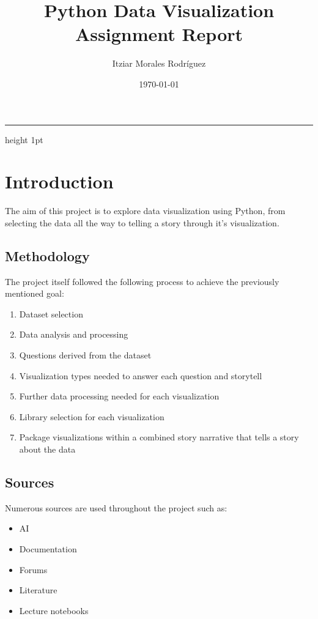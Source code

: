 \documentclass[a4paper,11pt]{article}
\title{\color{accent}\Huge Python Data Visualization\\Assignment Report}
\author{\Large\color{black}Itziar Morales Rodríguez}
\date{\large\color{black}\today}
\begin{document}
\pagecolor{background}\color{black}

\maketitle
\vspace{1em}
\hrule height 1pt \color{black}

\tableofcontents
\newpage

\section{Introduction}

\par
The aim of this project is to explore data visualization using Python, from
selecting the data all the way to telling a story through it's visualization.

\subsection{Methodology}

\par
The project itself followed the following process to achieve the previously
mentioned goal:
\begin{enumerate}
	\item Dataset selection
	\item Data analysis and processing
	\item Questions derived from the dataset
	\item Visualization types needed to answer each question and storytell
	\item Further data processing needed for each visualization
	\item Library selection for each visualization
	\item Package visualizations within a combined story narrative that tells a
	      story about the data
\end{enumerate}

\subsection{Sources}

\par
Numerous sources are used throughout the project such as:

\begin{itemize}
	\item AI
	\item Documentation
	\item Forums
	\item Literature
	\item Lecture notebooks
\end{itemize}
\end{document}
